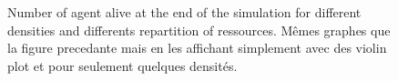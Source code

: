 \documentclass[a4paper]{article}
\begin{document}
\begin{figure}
\begin{tabular}[H]{ccc}
    \end{tabular}
    \caption{Number of agent alive at the end of the simulation for different densities and differents repartition of ressources. Mêmes graphes que la figure precedante mais en les affichant simplement avec des violin plot et pour seulement quelques densités.}
    \label{table:violin}
\end{figure}
\end{document}
